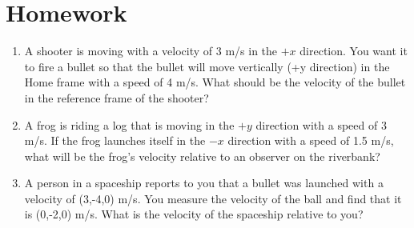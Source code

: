 

\pagebreak

\section{Homework}

\begin{enumerate}
	\item	A shooter is moving with a velocity of 3 m/s in the $+x$ direction. You want it to fire a bullet so that the bullet will move vertically (+y direction) in the Home frame with a speed of 4 m/s. What should be the velocity of the bullet in the reference frame of the shooter?
	
	\item A frog is riding a log that is moving in the $+y$ direction with a speed of 3 m/s. If the frog launches itself in the $-x$ direction with a speed of 1.5 m/s, what will be the frog's velocity relative to an observer on the riverbank?
	
	\item A person in a spaceship reports to you that a bullet was launched with a velocity of (3,-4,0) m/s. You measure the velocity of the ball and find that it is (0,-2,0) m/s. What is the velocity of the spaceship relative to you?

\end{enumerate}
